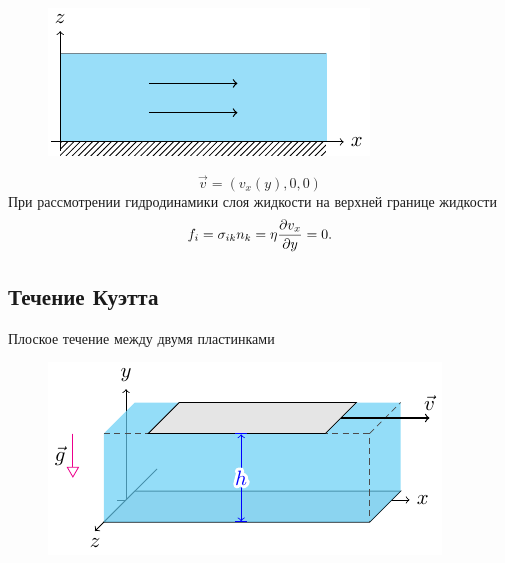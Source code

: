 \begin{figure}[h!]
    \centering
    \includegraphics[scale=1.5]{img/tv}
    \caption{}
    \label{fig:figure1}
\end{figure}
\begin{equation}
    \vec{v}= (v_x (y),0,0)
\end{equation}
При рассмотрении гидродинамики слоя жидкости на верхней границе жидкости
\begin{equation}
    f_i = \sigma_{ik} n_k =
    \eta\pdv{v_x}{y} = 0.
\end{equation}

\newpage
\subsection{Течение Куэтта}
Плоское течение между двумя пластинками 
\begin{figure}[h!]
    \centering
    \includegraphics[scale=1.5]{img/kuett}
    \caption{}
    \label{fig:figure1}
\end{figure}

